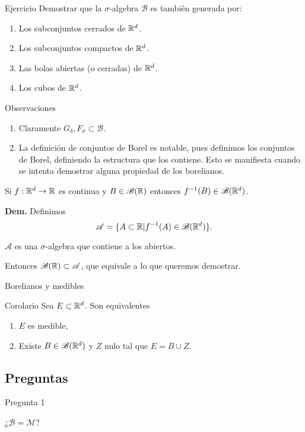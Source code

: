 {Ejercicio} Demostrar que la $\sigma$-algebra  $\mathscr{B}$ es también generada por:
\begin{enumerate}
 \item Los subconjuntos cerrados de $\mathbb{R}^d$.
 \item Los subconjuntos compactos de $\mathbb{R}^d$.
 \item Las bolas abiertas (o cerradas) de $\mathbb{R}^d$.
 \item Los cubos de $\mathbb{R}^d$.
\end{enumerate}

 

Observaciones
 \begin{enumerate}
 \item Claramente $G_{\delta},F_{\sigma}\subset\mathscr{B}$.
 \item La definición de conjuntos de Borel es notable, pues definimos los conjuntos de Borel, definiendo  la estructura que los contiene. Esto se manifiesta cuando se intenta demostrar alguna propiedad de los borelianos. 
\end{enumerate}
 \begin{ejemplo}{}
 Si $f:\mathbb{R}^d\to\mathbb{R}$ es continua y $B\in\mathscr{B}(\mathbb{R})$ entonces $f^{-1}(B)\in \mathscr{B}(\mathbb{R}^d)$. 
\end{ejemplo}
 \textbf{Dem.} Definimos
\[
 \mathscr{A}=\{A\subset\mathbb{R}|f^{-1}(A)\in  \mathscr{B}(\mathbb{R}^d)\}.
\]

\begin{ejercicio}{} $\mathscr{A}$ es una $\sigma$-algebra que contiene a los abiertos.
 \end{ejercicio}



Entonces $\mathscr{B}(\mathbb{R})\subset \mathscr{A}$, que equivale a lo que queremos demostrar.




Borelianos y medibles

{Corolario}
 Sea $E\subset\mathbb{R}^d$. Son equivalentes
 \begin{enumerate}
  \item $E$ es medible,
  \item Existe $B\in\mathscr{B}(\mathbb{R}^d)$ y $Z$ nulo tal que $E=B\cup Z$.
  
 \end{enumerate}


 


\subsection{Preguntas}
Pregunta 1
\centerline{¿$\boxed{\mathscr{B}=\mathscr{M}}$?}

